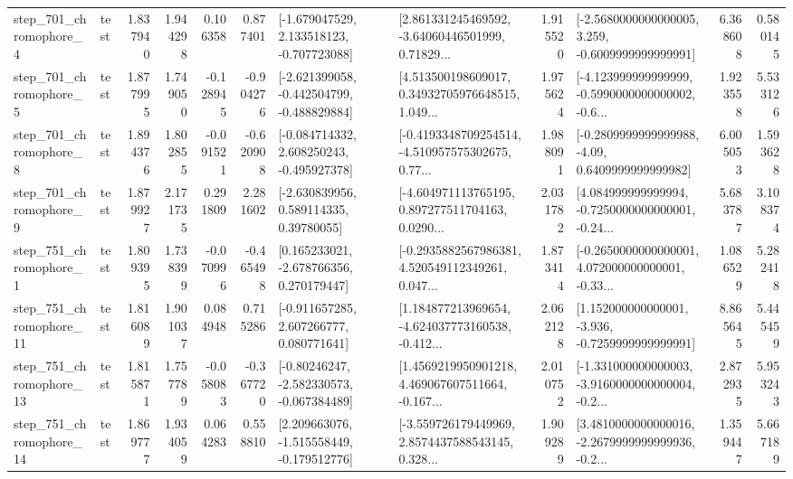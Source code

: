 \begin{tabular}{llrrrrllrlrr}
   step\_701\_chromophore\_4 &      test &      1.837940 &    1.944298 &      0.106358 &  0.877401 &   [-1.679047529, 2.133518123, -0.707723088] &  [2.861331245469592, -3.64060446501999, 0.71829... &       1.915520 &  [-2.5680000000000005, 3.259, -0.6009999999999991] &            6.368608 &          0.580145 \\
   step\_701\_chromophore\_5 &      test &      1.877995 &    1.749050 &     -0.128945 & -0.904276 &  [-2.621399058, -0.442504799, -0.488829884] &  [4.513500198609017, 0.34932705976648515, 1.049... &       1.975624 &  [-4.123999999999999, -0.5990000000000002, -0.6... &            1.923558 &          5.533126 \\
   step\_701\_chromophore\_8 &      test &      1.894376 &    1.802855 &     -0.091521 & -0.620908 &   [-0.084714332, 2.608250243, -0.495927378] &  [-0.4193348709254514, -4.510957575302675, 0.77... &       1.988091 &   [-0.2809999999999988, -4.09, 0.6409999999999982] &            6.005053 &          1.593628 \\
   step\_701\_chromophore\_9 &      test &      1.879927 &    2.171735 &      0.291809 &  2.281602 &     [-2.630839956, 0.589114335, 0.39780055] &  [-4.604971113765195, 0.897277511704163, 0.0290... &       2.031782 &  [4.084999999999994, -0.7250000000000001, -0.24... &            5.683787 &          3.108374 \\
   step\_751\_chromophore\_1 &      test &      1.809395 &    1.738399 &     -0.070996 & -0.465498 &    [0.165233021, -2.678766356, 0.270179447] &  [-0.2935882567986381, 4.520549112349261, 0.047... &       1.873414 &  [-0.2650000000000001, 4.072000000000001, -0.33... &            1.086529 &          5.282418 \\
  step\_751\_chromophore\_11 &      test &      1.816089 &    1.901037 &      0.084948 &  0.715286 &    [-0.911657285, 2.607266777, 0.080771641] &  [1.184877213969654, -4.624037773160538, -0.412... &       2.062128 &   [1.152000000000001, -3.936, -0.7259999999999991] &            8.865645 &          5.445459 \\
  step\_751\_chromophore\_13 &      test &      1.815871 &    1.757789 &     -0.058083 & -0.367720 &   [-0.80246247, -2.582330573, -0.067384489] &  [1.4569219950901218, 4.469067607511664, -0.167... &       2.010752 &  [-1.331000000000003, -3.9160000000000004, -0.2... &            2.872935 &          5.953243 \\
  step\_751\_chromophore\_14 &      test &      1.869777 &    1.934059 &      0.064283 &  0.558810 &   [2.209663076, -1.515558449, -0.179512776] &  [-3.559726179449969, 2.8574437588543145, 0.328... &       1.909289 &  [3.4810000000000016, -2.2679999999999936, -0.2... &            1.359447 &          5.667189 \\

\end{tabular}
